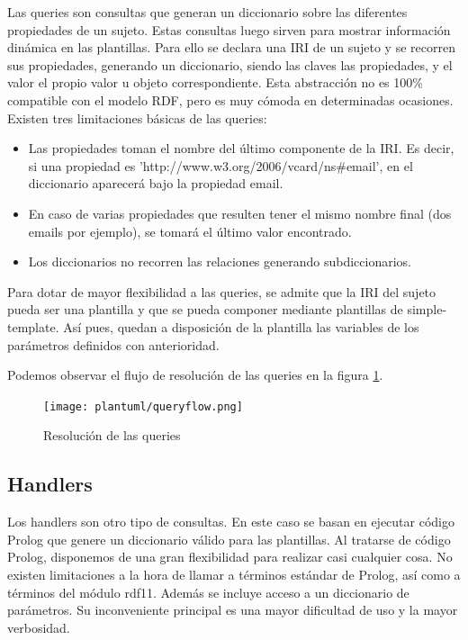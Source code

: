 \documentclass[openright,twoside,12pt]{book}
\begin{document}
Las queries son consultas que generan un diccionario sobre las diferentes propiedades de un sujeto. Estas consultas luego sirven para mostrar información dinámica en las plantillas. Para ello se declara una IRI de un sujeto y se recorren sus propiedades, generando un diccionario, siendo las claves las propiedades, y el valor el propio valor u objeto correspondiente. Esta abstracción no es 100\% compatible con el modelo RDF, pero es muy cómoda en determinadas ocasiones. Existen tres limitaciones básicas de las queries:
\begin{itemize}
    \item Las propiedades toman el nombre del último componente de la IRI. Es decir, si una propiedad es 'http://www.w3.org/2006/vcard/ns\#email', en el diccionario aparecerá bajo la propiedad email.
    \item En caso de varias propiedades que resulten tener el mismo nombre final (dos emails por ejemplo), se tomará el último valor encontrado.
    \item Los diccionarios no recorren las relaciones generando subdiccionarios.
\end{itemize}

Para dotar de mayor flexibilidad a las queries, se admite que la IRI del sujeto pueda ser una plantilla y que se pueda componer mediante plantillas de simple-template. Así pues, quedan a disposición de la plantilla las variables de los parámetros definidos con anterioridad.

Podemos observar el flujo de resolución de las queries en la figura \ref{fig:queryflow}.

\begin{figure}
    \centering
    \texttt{[image: plantuml/queryflow.png]}
    \caption{Resolución de las queries}
    \label{fig:queryflow}
\end{figure}

\subsection{Handlers}

Los handlers son otro tipo de consultas. En este caso se basan en ejecutar código Prolog que genere un diccionario válido para las plantillas. Al tratarse de código Prolog, disponemos de una gran flexibilidad para realizar casi cualquier cosa. No existen limitaciones a la hora de llamar a términos estándar de Prolog, así como a términos del módulo rdf11. Además se incluye acceso a un diccionario de parámetros. Su inconveniente principal es una mayor dificultad de uso y la mayor verbosidad.
\end{document}
